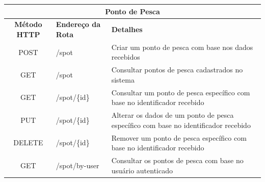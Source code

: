 \begin{quadro}[h!]
    \centering
    \caption[Rotas Disponiveis Continuação]{Rotas Disponiveis Continuação
    \label{qua:quadro-api-rotas-p2}}
    \setlength{\extrarowheight}{4pt}
    \begin{tabular}{|c|l|p{}|} 

        \hline
        \multicolumn{3}{|c|}{\textbf{Ponto de Pesca}} \\
        \hline
        \textbf{Método HTTP} & \textbf{Endereço da Rota} & \textbf{Detalhes} \\
        \hline
        POST & /spot & Criar um ponto de pesca com base nos dados recebidos \\
        \hline
        GET & /spot & Consultar pontos de pesca cadastrados no sistema \\
        \hline
        GET & /spot/\{id\} & Consultar um ponto de pesca específico com base no identificador recebido \\
        \hline
        PUT & /spot/\{id\} & Alterar os dados de um ponto de pesca específico com base no identificador recebido \\
        \hline
        DELETE & /spot/\{id\} & Remover um ponto de pesca específico com base no identificador recebido \\
        \hline
        GET & /spot/by-user & Consultar os pontos de pesca com base no usuário autenticado \\
        \hline
        
    \end{tabular}
\end{quadro}